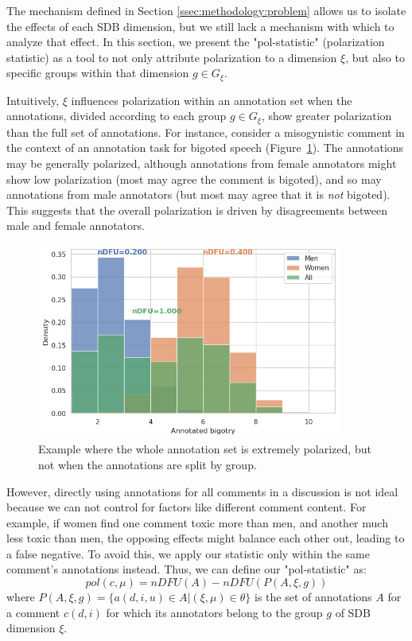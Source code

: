 \documentclass{article}
\begin{document}
The mechanism defined in Section \ref{ssec:methodology:problem} allows us to isolate the effects of each \ac{SDB} dimension, but we still lack a mechanism with which to analyze that effect. In this section, we present the "pol-statistic" (polarization statistic) as a tool to not only attribute polarization to a dimension $\xi$, but also to specific groups within that dimension $g \in G_{\xi}$.

Intuitively, $\xi$ influences polarization within an annotation set when the annotations, divided according to each group $g \in G_{\xi}$, show greater polarization than the full set of annotations. For instance, consider a misogynistic comment in the context of an annotation task for bigoted speech (Figure~\ref{fig:ndfu_single_comment}). The annotations may be generally polarized, although annotations from female annotators might show low polarization (most may agree the comment is bigoted), and so may annotations from male annotators (but most may agree that it is \textit{not} bigoted). This suggests that the overall polarization is driven by disagreements between male and female annotators. 

\begin{figure}
	\centering
	\includegraphics[width=10cm]{ndfu_single_comment.png}
	\caption{Example where the whole annotation set is extremely polarized, but not when the annotations are split by group.}
	\label{fig:ndfu_single_comment}
\end{figure}

 However, directly using annotations for all comments in a discussion is not ideal because we can not control for factors like different comment content. For example, if women find one comment toxic more than men, and another much less toxic than men, the opposing effects might balance each other out, leading to a false negative. To avoid this, we apply our statistic only within the same comment’s annotations instead. Thus, we can define our "pol-statistic" as:
\begin{equation}
	pol(c, \mu) = nDFU(A) - nDFU(P(A, \xi, g))
\end{equation}
\noindent where $P(A,\xi, g) = \{a(d, i, u) \in A | (\xi, \mu) \in \theta\}$ is the set of annotations $A$ for a comment $c(d, i)$ for which its annotators belong  to the group $g$ of \ac{SDB} dimension $\xi$.
\end{document}
